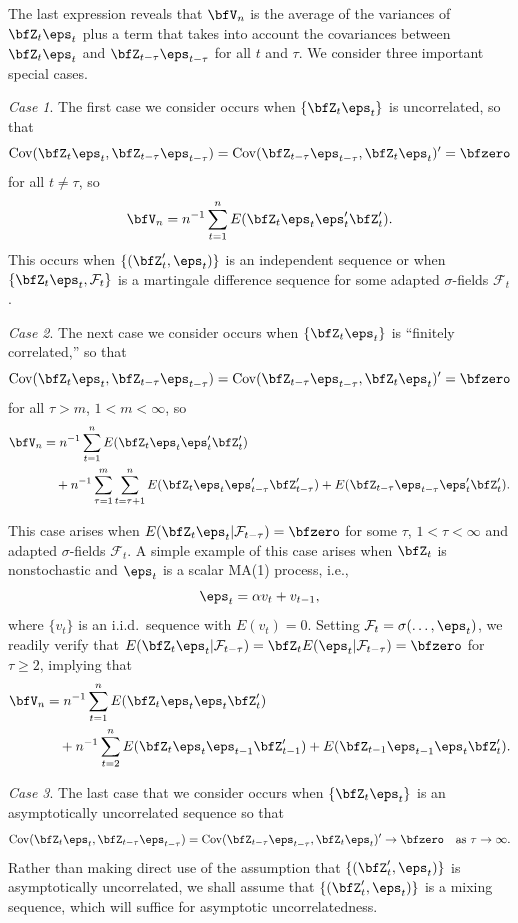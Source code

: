The last expression reveals that $\bfV_n$ is the average of the variances of $\bfZ_t\eps_t$ plus a term that takes into account the covariances between $\bfZ_t\eps_t$ and $\bfZ_{t-\tau}\eps_{t-\tau}$ for all $t$ and $\tau$. We consider three important special cases.

\emph{Case 1}. The first case we consider occurs when $\{\bfZ_t\eps_t\}$ is uncorrelated, so that
\[
  \Cov(\bfZ_t\eps_t,\bfZ_{t-\tau}\eps_{t-\tau}) = \Cov(\bfZ_{t-\tau}\eps_{t-\tau},\bfZ_t\eps_t)' = \bfzero
\]
for all $t \neq \tau$, so
\[
  \bfV_n = n^{-1}\sum_{t=1}^{n}E(\bfZ_t\eps_t\eps_t'\bfZ_t').
\]
This occurs when $\{(\bfZ_t',\eps_t)\}$ is an independent sequence or when $\{\bfZ_t\eps_t,\mathcal{F}_t\}$ is a martingale difference sequence for some adapted $\sigma$-fields $\mathcal{F}_t$.

\emph{Case 2}. The next case we consider occurs when $\{\bfZ_t\eps_t\}$ is ``finitely correlated,'' so that
\[
  \Cov(\bfZ_t\eps_t,\bfZ_{t-\tau}\eps_{t-\tau}) = \Cov(\bfZ_{t-\tau}\eps_{t-\tau},\bfZ_t\eps_t)' = \bfzero
\]
for all $\tau > m$, $1 < m < \infty$, so
\begin{align*}
  \bfV_n &= n^{-1}\sum_{t=1}^{n}E(\bfZ_t\eps_t\eps_t'\bfZ_t') \\
    &\quad + n^{-1}\sum_{\tau=1}^{m}\sum_{t=\tau+1}^{n}
      E(\bfZ_t\eps_t\eps_{t-\tau}'\bfZ_{t-\tau}') + E(\bfZ_{t-\tau}\eps_{t-\tau}\eps_t'\bfZ_t').
\end{align*}

This case arises when $E(\bfZ_t\eps_t|\mathcal{F}_{t-\tau}) = \bfzero$ for some $\tau$, $1 < \tau < \infty$ and adapted $\sigma$-fields $\mathcal{F}_t$. A simple example of this case arises when $\bfZ_t$ is nonstochastic and $\eps_t$ is a scalar MA(1) process, i.e.,
\[
  \eps_t = \alpha v_t + v_{t-1},
\]
where $\{v_t\}$ is an i.i.d.\ sequence with $E(v_t)=0$. Setting $\mathcal{F}_t = \sigma(\ldots,\eps_t)$, we readily verify that $E(\bfZ_t\eps_t|\mathcal{F}_{t-\tau}) = \bfZ_t E(\eps_t|\mathcal{F}_{t-\tau}) = \bfzero$ for $\tau \geq 2$, implying that
\begin{align*}
  \bfV_n &= n^{-1}\sum_{t=1}^{n}E(\bfZ_t\eps_t\eps_t\bfZ_t') \\
    &\quad + n^{-1}\sum_{t=2}^{n}E(\bfZ_t\eps_t\eps_{t-1}\bfZ_{t-1}') + E(\bfZ_{t-1}\eps_{t-1}\eps_t\bfZ_t').
\end{align*}

\emph{Case 3}. The last case that we consider occurs when $\{\bfZ_t\eps_t\}$ is an asymptotically uncorrelated sequence so that
\[
  \Cov(\bfZ_t\eps_t,\bfZ_{t-\tau}\eps_{t-\tau}) = \Cov(\bfZ_{t-\tau}\eps_{t-\tau},\bfZ_t\eps_t)' \to \bfzero \quad \text{as } \tau \to \infty.
\]
Rather than making direct use of the assumption that $\{(\bfZ_t',\eps_t)\}$ is asymptotically uncorrelated, we shall assume that $\{(\bfZ_t',\eps_t)\}$ is a mixing sequence, which will suffice for asymptotic uncorrelatedness.

